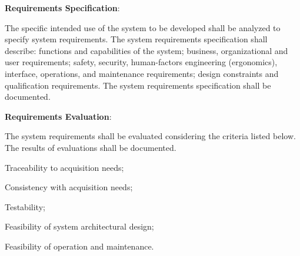 			\begin{adjustwidth}{2em}{0pt} 

				\begin{compactenum}

					\item {\bf Requirements Specification}:

					\begin{compactenum}

						\item The specific intended use of the system to be developed shall be analyzed to specify system requirements. The system requirements specification shall describe: functions and capabilities of the system; business, organizational and user requirements; safety, security, human-factors engineering (ergonomics), interface, operations, and maintenance requirements; design constraints and qualification requirements. The system requirements specification shall be documented.

					\end{compactenum}

					\item {\bf Requirements Evaluation}:

					\begin{compactenum}

						\item The system requirements shall be evaluated considering the criteria listed below. The results of evaluations shall be documented.

						\begin{compactenum}

							\item Traceability to acquisition needs;

							\item Consistency with acquisition needs;

							\item Testability;

							\item Feasibility of system architectural design;

							\item Feasibility of operation and maintenance.

						\end{compactenum}

					\end{compactenum}

				\end{compactenum}

			\end{adjustwidth}

